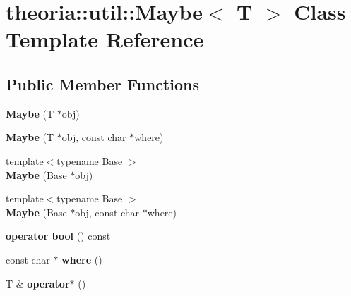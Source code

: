 \hypertarget{classtheoria_1_1util_1_1Maybe}{}\section{theoria\+:\+:util\+:\+:Maybe$<$ T $>$ Class Template Reference}
\label{classtheoria_1_1util_1_1Maybe}
\subsection*{Public Member Functions}
\begin{DoxyCompactItemize}
\item 
\mbox{\label{classtheoria_1_1util_1_1Maybe_aff51836d12cb53b458316be21391e847}} 
{\bfseries Maybe} (T $\ast$obj)
\item 
\mbox{\label{classtheoria_1_1util_1_1Maybe_a20f1e97e3620fed19c579ffdc9063bf8}} 
{\bfseries Maybe} (T $\ast$obj, const char $\ast$where)
\item 
\mbox{\label{classtheoria_1_1util_1_1Maybe_a077b3ce153debaf6adb797ebf494745b}} 
{\footnotesize template$<$typename Base $>$ }\\{\bfseries Maybe} (Base $\ast$obj)
\item 
\mbox{\label{classtheoria_1_1util_1_1Maybe_a955e6b90184ad9e054038ebbd8dab3c6}} 
{\footnotesize template$<$typename Base $>$ }\\{\bfseries Maybe} (Base $\ast$obj, const char $\ast$where)
\item 
\mbox{\label{classtheoria_1_1util_1_1Maybe_aa88cfe148c9279e1ed6de5ed145d6e23}} 
{\bfseries operator bool} () const
\item 
\mbox{\label{classtheoria_1_1util_1_1Maybe_a2dbc83104aa3cac55f043e468ef3e86f}} 
const char $\ast$ {\bfseries where} ()
\item 
\mbox{\label{classtheoria_1_1util_1_1Maybe_abe504b965167614138072fe5d227f3f6}} 
T \& {\bfseries operator$\ast$} ()
\item 

\end{DoxyCompactItemize}
